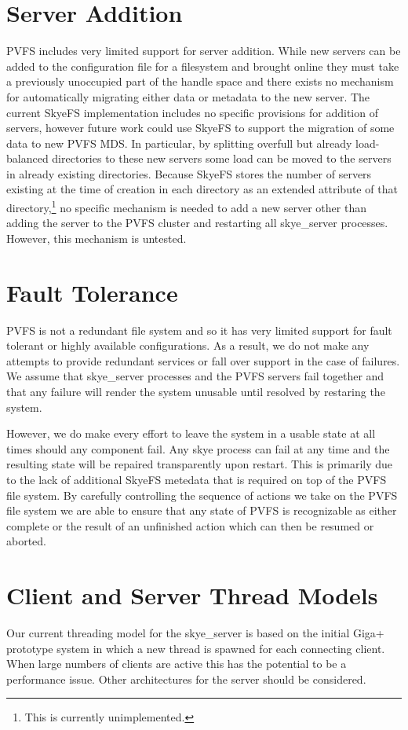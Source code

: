 \documentclass[letterpaper]{article}
\begin{document}
\section{Server Addition}
PVFS includes very limited support for server addition.  While new servers can
be added to the configuration file for a filesystem and brought online they must
take a previously unoccupied part of the handle space and there exists no
mechanism for automatically migrating either data or metadata to the new server.
The current SkyeFS implementation includes no specific provisions for addition
of servers, however future work could use SkyeFS to support the migration of
some data to new PVFS MDS.  In particular, by splitting overfull but already
load-balanced directories to these new servers some load can be moved to the
servers in already existing directories.  Because SkyeFS stores the number of
servers existing at the time of creation in each directory as an extended
attribute of that directory,\footnote{This is currently unimplemented.} no
specific mechanism is needed to add a new server other than adding the server
to the PVFS cluster and restarting all skye\_\-server processes.  However,
this mechanism is untested.

\section{Fault Tolerance}
PVFS is not a redundant file system and so it has very limited support for fault
tolerant or highly available configurations.  As a result, we do not make any
attempts to provide redundant services or fall over support in the case of
failures.  We assume that skye\_\-server processes and the PVFS servers fail
together and that any failure will render the system unusable until resolved by
restaring the system.

However, we do make every effort to leave the system in a usable state at all
times should any component fail.  Any skye process can fail at any time and the
resulting state will be repaired transparently upon restart.  This is primarily
due to the lack of additional SkyeFS metedata that is required on top of the
PVFS file system.  By carefully controlling the sequence of actions we take on
the PVFS file system we are able to ensure that any state of PVFS is
recognizable as either complete or the result of an unfinished action which can
then be resumed or aborted.

\section{Client and Server Thread Models}
Our current threading model for the skye\_\-server is based on the initial Giga+
prototype system in which a new thread is spawned for each connecting client.
When large numbers of clients are active this has the potential to be a
performance issue.  Other architectures for the server should be considered. 
\end{document}
